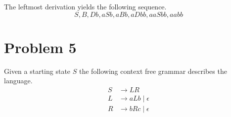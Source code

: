\documentclass[12pt]{article}
\begin{document}
The leftmost derivation yields the following sequence.
\[S, B, Db, aSb, aBb, aDbb, aaSbb, aabb\]

\section*{Problem 5}

Given a starting state \(S\) the following context free grammar describes the language.
\begin{align*}
        S &\rightarrow LR\\
        L &\rightarrow aLb\mid\epsilon\\
        R &\rightarrow bRc\mid\epsilon\\
\end{align*}
\end{document}
